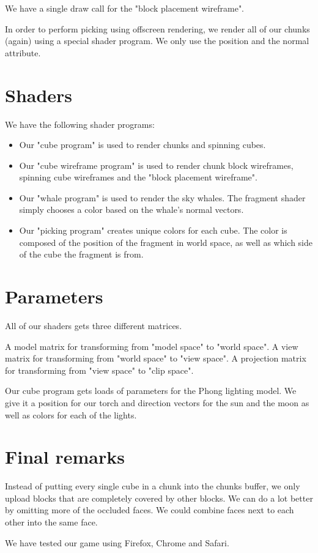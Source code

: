 \documentclass[12pt,leqno]{article}
\begin{document}
We have a single draw call for the "block placement wireframe".

In order to perform picking using offscreen rendering, we render all of our chunks (again) using a special shader program. We only use the position and the normal attribute.

\section{Shaders}
We have the following shader programs:
\begin{itemize}
	\item Our "cube program" is used to render chunks and spinning cubes.
	\item Our "cube wireframe program" is used to render chunk block wireframes, spinning cube wireframes and the "block placement wireframe".
	\item Our "whale program" is used to render the sky whales. The fragment shader simply chooses a color based on the whale's normal vectors.
	\item Our "picking program" creates unique colors for each cube. The color is composed of the position of the fragment in world space, as well as which side of the cube the fragment is from.
\end{itemize}

\section{Parameters}

All of our shaders gets three different matrices.

A model matrix for transforming from "model space" to "world space".
A view matrix for transforming from "world space" to "view space".
A projection matrix for transforming from "view space" to "clip space".

Our cube program gets loads of parameters for the Phong lighting model. We give it a position for our torch and direction vectors for the sun and the moon as well as colors for each of the lights.

\section{Final remarks}

Instead of putting every single cube in a chunk into the chunks buffer, we only upload blocks that are completely covered by other blocks.
We can do a lot better by omitting more of the occluded faces.
We could combine faces next to each other into the same face.

We have tested our game using Firefox, Chrome and Safari.

\end{document}
